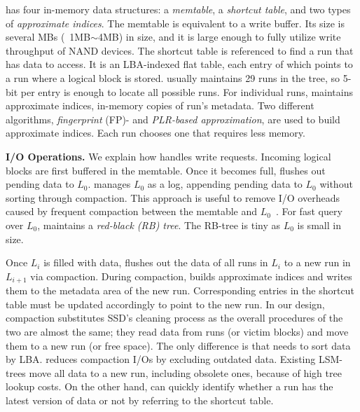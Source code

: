 \ours{} has four in-memory data structures: a \textit{memtable}, a
\textit{shortcut table}, and two types of \textit{approximate indices}.  
The memtable is equivalent to a write buffer. Its size is several MBs
(\eg~1MB$\sim$4MB) in size, and it is large enough to fully utilize write
throughput of NAND devices. The shortcut table is referenced to find a run that
has data to access.  It is an LBA-indexed flat table, each entry of which
points to a run where a logical block is stored.  \ours{} usually maintains 29
runs in the tree, so 5-bit per entry is enough to locate all possible runs.
For individual runs, \ours{} maintains approximate indices, 
in-memory copies of run's metadata. 
Two different algorithms, \textit{fingerprint} (FP)- and
\textit{PLR-based approximation}, are used to build approximate
indices. Each run chooses one that requires less memory.



\textbf{I/O Operations.}
We explain how \ours{} handles write requests.  Incoming logical blocks
are first buffered in the memtable.  Once it becomes full, \ours{} flushes out
pending data to $L_0$.  \ours{} manages $L_0$ as a log,
appending pending data to $L_0$ without sorting through compaction.  This
approach is useful to remove I/O overheads caused by frequent compaction
between the memtable and $L_0$~\cite{rocksdb,leveldb}.  For fast query over $L_0$, \ours{}
maintains a \textit{red-black (RB) tree}.  
The RB-tree is tiny as $L_0$ is small in size. 

Once $L_i$ is filled with data, \ours{} flushes out 
the data of all runs in $L_i$ to a new run in $L_{i+1}$
via compaction. 
During compaction, 
\ours{} builds approximate indices and writes them to the metadata area 
of the new run.
Corresponding entries in the shortcut table must be updated 
accordingly to point to the new run.
In our design, compaction substitutes SSD's cleaning process
as the overall procedures of the two are almost the same; 
they read data from runs
(or victim blocks) and move them to a new run (or free space). 
The only difference is that \ours{} needs to sort data by LBA.  
\ours{} reduces compaction I/Os by excluding outdated data.
Existing LSM-trees move all data to a new run, including obsolete ones,
because of high tree lookup costs. On the other hand,
\ours{} can quickly identify whether a run has the latest version of 
data or not by referring to the shortcut table.

